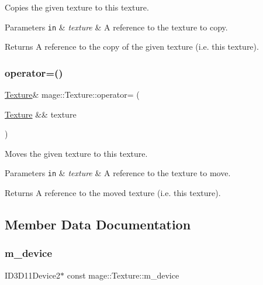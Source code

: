 Copies the given texture to this texture.


\begin{DoxyParams}[1]{Parameters}
\mbox{\tt in}  & {\em texture} & A reference to the texture to copy. \\
\hline
\end{DoxyParams}
\begin{DoxyReturn}{Returns}
A reference to the copy of the given texture (i.\+e. this texture). 
\end{DoxyReturn}
\hypertarget{classmage_1_1_texture_a765e9cf3bddedbe2795dea0fe57245ff}{}\label{classmage_1_1_texture_a765e9cf3bddedbe2795dea0fe57245ff} 
\subsubsection{\texorpdfstring{operator=()}{operator=()}\hspace{0.1cm}{\footnotesize\ttfamily [2/2]}}
{\footnotesize\ttfamily \hyperlink{classmage_1_1_texture}{Texture}\& mage\+::\+Texture\+::operator= (\begin{DoxyParamCaption}\item[{\hyperlink{classmage_1_1_texture}{Texture} \&\&}]{texture }\end{DoxyParamCaption})\hspace{0.3cm}{\ttfamily [delete]}}

Moves the given texture to this texture.


\begin{DoxyParams}[1]{Parameters}
\mbox{\tt in}  & {\em texture} & A reference to the texture to move. \\
\hline
\end{DoxyParams}
\begin{DoxyReturn}{Returns}
A reference to the moved texture (i.\+e. this texture). 
\end{DoxyReturn}


\subsection{Member Data Documentation}
\hypertarget{classmage_1_1_texture_ad5409f37b321649bc1a12bcee8eb661b}{}\label{classmage_1_1_texture_ad5409f37b321649bc1a12bcee8eb661b} 
\subsubsection{\texorpdfstring{m\+\_\+device}{m\_device}}
{\footnotesize\ttfamily I\+D3\+D11\+Device2$\ast$ const mage\+::\+Texture\+::m\+\_\+device\hspace{0.3cm}{\ttfamily [private]}}

